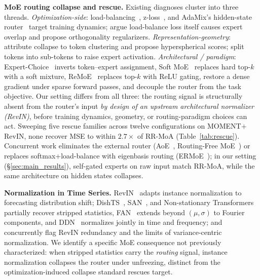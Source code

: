 \documentclass{article}
\begin{document}
\textbf{MoE routing collapse and rescue.} Existing diagnoses cluster into three threads. \emph{Optimization-side}: load-balancing~\citep{fedus2022switch}, z-loss~\citep{zoph2022stmoe}, and AdaMix's hidden-state router~\citep{wang2022adamix} target training dynamics; \citet{guo2025expertspec} argue load-balance loss itself causes expert overlap and propose orthogonality regularizers. \emph{Representation-geometry}: \citet{chi2022representation} attribute collapse to token clustering and propose hyperspherical scores; \citet{wu2024mhmoe} split tokens into sub-tokens to raise expert activation. \emph{Architectural / paradigm}: Expert-Choice~\citep{zhou2022expertchoice} inverts token--expert assignment, Soft MoE~\citep{puigcerver2024softmoe} replaces hard top-$k$ with a soft mixture, ReMoE~\citep{wang2025remoe} replaces top-$k$ with ReLU gating, \citet{panda2024densebackprop} restore a dense gradient under sparse forward passes, and \citet{hua2025inputaware} decouple the router from the task objective. Our setting differs from all three: the routing signal is structurally absent from the router's input \emph{by design of an upstream architectural normalizer (RevIN)}, before training dynamics, geometry, or routing-paradigm choices can act. Sweeping five rescue families across twelve configurations on MOMENT$+$RevIN, none recover MSE to within $2.7{\times}$ of RR-MoA (Table~\ref{tab:rescue}). Concurrent work eliminates the external router (AoE~\citep{lv2025aoe}, Routing-Free MoE~\citep{liu2026routingfree}) or replaces softmax+load-balance with eigenbasis routing (ERMoE~\citep{cheng2025ermoe}); in our setting (\S\ref{sec:main_results}), self-gated experts on raw input match RR-MoA, while the same architecture on hidden states collapses.

\textbf{Normalization in Time Series.} RevIN~\citep{kim2021revin} adapts instance normalization to forecasting distribution shift; DishTS~\citep{fan2023dishts}, SAN~\citep{liu2023san}, and Non-stationary Transformers~\citep{liu2022nonstationary} partially recover stripped statistics, FAN~\citep{ye2024fan} extends beyond $(\mu,\sigma)$ to Fourier components, and DDN~\citep{dai2024ddn} normalizes jointly in time and frequency; \citet{berthelier2026revin} and \citet{zou2025ibnorm} concurrently flag RevIN redundancy and the limits of variance-centric normalization. We identify a specific MoE consequence not previously characterized: when stripped statistics carry the \emph{routing} signal, instance normalization collapses the router under unfreezing, distinct from the optimization-induced collapse standard rescues target.
\end{document}
